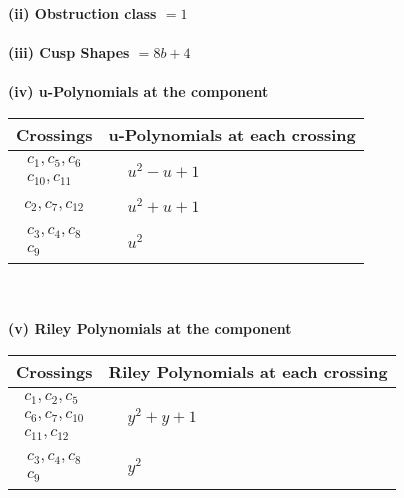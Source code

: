 \documentclass[1p]{elsarticle_modified}
\theoremstyle{definition}
\begin{document}
\flushleft \textbf{(ii) Obstruction class $= 1$}\\~\\
\flushleft \textbf{(iii) Cusp Shapes $= 8 b+4$}\\~\\
\newpage\renewcommand{\arraystretch}{1}
\flushleft \textbf{(iv) u-Polynomials at the component}\newline \\
\begin{tabular}{m{50pt}|m{274pt}}
Crossings & \hspace{64pt}u-Polynomials at each crossing \\
\hline $$\begin{aligned}c_{1},c_{5},c_{6}\\c_{10},c_{11}\end{aligned}$$&$\begin{aligned}
&u^2- u+1
\end{aligned}$\\
\hline $$\begin{aligned}c_{2},c_{7},c_{12}\end{aligned}$$&$\begin{aligned}
&u^2+u+1
\end{aligned}$\\
\hline $$\begin{aligned}c_{3},c_{4},c_{8}\\c_{9}\end{aligned}$$&$\begin{aligned}
&u^2
\end{aligned}$\\
\hline
\end{tabular}\\~\\
\newpage\renewcommand{\arraystretch}{1}
\flushleft \textbf{(v) Riley Polynomials at the component}\newline \\
\begin{tabular}{m{50pt}|m{274pt}}
Crossings & \hspace{64pt}Riley Polynomials at each crossing \\
\hline $$\begin{aligned}c_{1},c_{2},c_{5}\\c_{6},c_{7},c_{10}\\c_{11},c_{12}\end{aligned}$$&$\begin{aligned}
&y^2+y+1
\end{aligned}$\\
\hline $$\begin{aligned}c_{3},c_{4},c_{8}\\c_{9}\end{aligned}$$&$\begin{aligned}
&y^2
\end{aligned}$\\
\hline
\end{tabular}\\~\\
\end{document}
